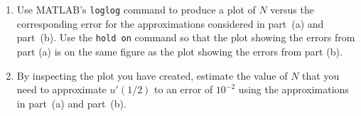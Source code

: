 \begin{enumerate}
\vspace*{1em} 
\item Use MATLAB's \verb|loglog| command to produce a plot of $N$ versus the corresponding error for the approximations considered in part~(a) and part~(b). Use the \verb|hold on| command so that the plot showing the errors from part (a) is on the same figure as the plot showing the errors from part (b).

\vspace*{1em} 
\item By inspecting the plot you have created, estimate the value of $N$ that you
      need to approximate $u'(1/2)$ to an error of $10^{-2}$ using the approximations
      in part~(a) and part~(b).
\end{enumerate}




